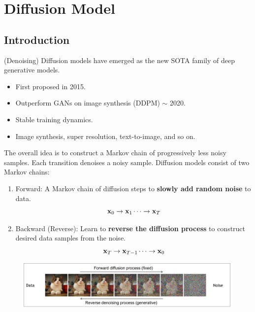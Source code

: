 \chapter{Diffusion Model}
\section{Introduction}

	(Denoising) Diffusion models have emerged as the new SOTA family of deep generative models. 
	\begin{itemize}
		\item First proposed in 2015.
		\item Outperform GANs on image synthesis (DDPM) $\sim$ 2020.
		\item Stable training dynamics.
		\item Image synthesis, super resolution, text-to-image, and so on.
	\end{itemize}

	The overall idea is to construct a Markov chain of progressively less noisy samples. Each transition denoises a noisy sample. Diffusion models consist of two Markov chains:
	\begin{enumerate}
		\item Forward: A Markov chain of diffusion steps to \textbf{slowly add random noise} to data. 
			$${\mathbf{x}}_0\to {\mathbf{x}}_1\cdots\to {\mathbf{x}}_T$$
		\item Backward (Reverse): Learn to \textbf{reverse the diffusion process} to construct desired data samples from the noise. 
			$${\mathbf{x}}_T\to {\mathbf{x}}_{T-1}\cdots\to {\mathbf{x}}_0$$
	\end{enumerate}
	\begin{figure}[t]
		\centering
		\includegraphics[scale=0.28]{./images/diffusion/diffusion_model.png}
	\end{figure}

